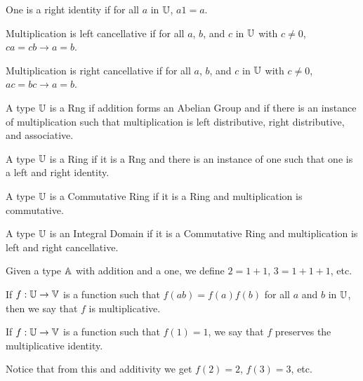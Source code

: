\documentclass[../../math.tex]{subfiles}
\begin{document}
\begin{class}
    One is a right identity if for all $a$ in $\mathbb{U}$, $a1 = a$.
\end{class}

\begin{class}
    Multiplication is left cancellative if for all $a$, $b$, and $c$ in $\mathbb{U}$
    with $c \neq 0$, $ca = cb \rightarrow a = b$.
\end{class}

\begin{class}
    Multiplication is right cancellative if for all $a$, $b$, and $c$ in $\mathbb{U}$
    with $c \neq 0$, $ac = bc \rightarrow a = b$.
\end{class}

\begin{class}[Rng]
    A type $\mathbb{U}$ is a Rng if addition forms an Abelian Group and if there is an
    instance of multiplication such that multiplication is left distributive,
    right distributive, and associative.
\end{class}

\begin{class}[Ring]
    A type $\mathbb{U}$ is a Ring if it is a Rng and there is an instance of one such
    that one is a left and right identity.
\end{class}

\begin{class}
    A type $\mathbb{U}$ is a Commutative Ring if it is a Ring and multiplication is
    commutative.
\end{class}

\begin{class}
    A type $\mathbb{U}$ is an Integral Domain if it is a Commutative Ring and
    multiplication is left and right cancellative.
\end{class}

\begin{definition}
    Given a type $\mathbb{A}$ with addition and a one, we define $2 = 1 + 1$, $3 = 1 +
    1 + 1$, etc.
\end{definition}

\begin{class}
    If $f : \mathbb{U} \to \mathbb{V}$ is a function such that $f(ab) = f(a)f(b)$ for all $a$
    and $b$ in $\mathbb{U}$, then we say that $f$ is multiplicative.
\end{class}

\begin{class}
    If $f : \mathbb{U} \to \mathbb{V}$ is a function such that $f(1) = 1$, we say that $f$
    preserves the multiplicative identity.
\end{class}
Notice that from this and additivity we get $f(2) = 2$, $f(3) = 3$, etc.
\end{document}
